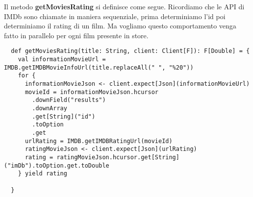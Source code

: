 \noindent Il metodo \textbf{getMoviesRating} si definisce come segue. Ricordiamo che le API di IMDb sono chiamate in maniera sequenziale, prima determiniamo l'id poi determiniamo il rating di un film. Ma vogliamo questo comportamento venga fatto in parallelo per ogni film presente in store.

\begin{verbatim}
  def getMoviesRating(title: String, client: Client[F]): F[Double] = {
    val informationMovieUrl = IMDB.getIMDBMovieInfoUrl(title.replaceAll(" ", "%20"))
    for {
      informationMovieJson <- client.expect[Json](informationMovieUrl)
      movieId = informationMovieJson.hcursor
        .downField("results")
        .downArray
        .get[String]("id")
        .toOption
        .get
      urlRating = IMDB.getIMDBRatingUrl(movieId)
      ratingMovieJson <- client.expect[Json](urlRating)
      rating = ratingMovieJson.hcursor.get[String]("imDb").toOption.get.toDouble
    } yield rating

  }
    
\end{verbatim}